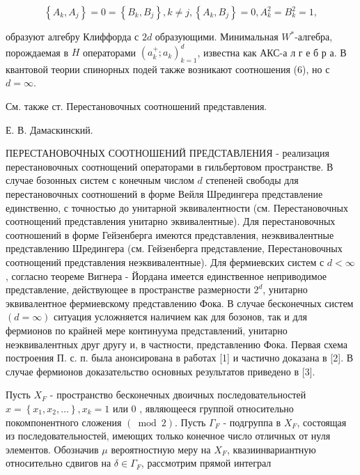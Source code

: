 \documentclass[10pt]{article}
\begin{document}
\[

\left\{A_{k}, A_{j}\right\}=0=\left\{B_{k}, B_{j}\right\}, k \neq j,\left\{A_{k}, B_{j}\right\}=0, A_{k}^{2}=B_{k}^{2}=1,

\]



образуют алгебру Клиффорда с $2 d$ образующими. Минимальная $W^{*}$-алгебра, порождаемая в $H$ операторами $\left(a_{k}^{+} ; a_{k}\right)_{k=1}^{d}$, известна как АКС-а л г е б р а. В квантовой теории спинорных подей также возникают соотношения (6), но с $d=\infty$.



См. также ст. Перестановочных соотношений представления.



Е. В. Дамаскинский.



ПЕРЕСТАНОВОЧНЫХ СООТНОШЕНИЙ ПРЕДСТАВЛЕНИЯ - реализация перестановочных соотнощений операторами в гильбертовом пространстве. В случае бозонных систем с конечным числом $d$ степеней свободы для перестановочных соотношений в форме Вейля Шредингера представление единственно, с точностью до унитарной эквивалентности (см. Перестановочных соотнощений представления унитарно эквивалентные). Для перестановочных соотношений в форме Гейзенберга имеются представления, неэквивалентные представлению Шредингера (см. Гейзенберга представление, Перестановочных соотнощений представления неэквивалентные). Для фермиевских систем с $d<\infty$, согласно теореме Вигнера - Йордана имеется единственное неприводимое представление, действующее в пространстве размерности $2^{d}$, унитарно эквивалентное фермиевскому представлению Фока. В случае бесконечных систем $(d=\infty)$ ситуация усложняется наличием как для бозонов, так и для фермионов по крайней мере континуума представлений, унитарно неэквивалентных друг другу и, в частности, представлению Фока. Первая схема построения П. с. п. была анонсирована в работах [1] и частично доказана в [2]. В случае фермионов доказательство основных результатов приведено в [3].



Пусть $X_{F}$ - пространство бесконечных двоичных последовательностей $x=\left\{x_{1}, x_{2}, \ldots\right\}, x_{k}=1$ или 0 , являющееся группой относительно покомпонентного сложения $(\bmod 2)$. Пусть $\Gamma_{F}$ - подгруппа в $X_{F}$, состоящая из последовательностей, имеющих только конечное число отличных от нуля элементов. Обозначив $\mu$ вероятностную меру на $X_{F}$, квазиинвариантную относительно сдвигов на $\delta \in \Gamma_{F}$, рассмотрим прямой интеграл
\end{document}
